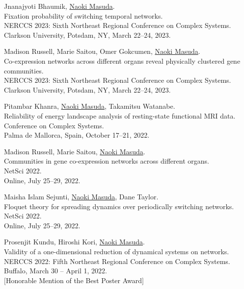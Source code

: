 \documentclass[11pt,letter]{article}
\begin{document}
\begin{etaremune}

\item Jnanajyoti Bhaumik, \underline{Naoki Masuda}.\\
Fixation probability of switching temporal networks.\\
NERCCS 2023: Sixth Northeast Regional Conference on Complex Systems.\\
Clarkson University, Potsdam, NY, March 22--24, 2023.

\item Madison Russell, Marie Saitou, Omer Gokcumen, \underline{Naoki Masuda}.\\
Co-expression networks across different organs reveal physically clustered gene communities.\\
NERCCS 2023: Sixth Northeast Regional Conference on Complex Systems.\\
Clarkson University, Potsdam, NY, March 22--24, 2023.
	
\item Pitambar Khanra, \underline{Naoki Masuda}, Takamitsu Watanabe.\\
Reliability of energy landscape analysis of resting-state functional MRI data.\\
Conference on Complex Systems.\\
Palma de Mallorca, Spain, October 17--21, 2022.

\item Madison Russell, Marie Saitou, \underline{Naoki Masuda}.\\
Communities in gene co-expression networks across different organs.\\
NetSci 2022.\\
Online, July 25--29, 2022.

\item Maisha Islam Sejunti, \underline{Naoki Masuda}, Dane Taylor.\\
Floquet theory for spreading dynamics over periodically switching networks.\\
NetSci 2022.\\
Online, July 25--29, 2022.

\item Prosenjit Kundu, Hiroshi Kori, \underline{Naoki Masuda}.\\
Validity of a one-dimensional reduction of dynamical systems on networks.\\
NERCCS 2022: Fifth Northeast Regional Conference on Complex Systems.\\
Buffalo, March 30 -- April 1, 2022.\\
$[$Honorable Mention of the Best Poster Award$]$


\end{etaremune}
\end{document}
